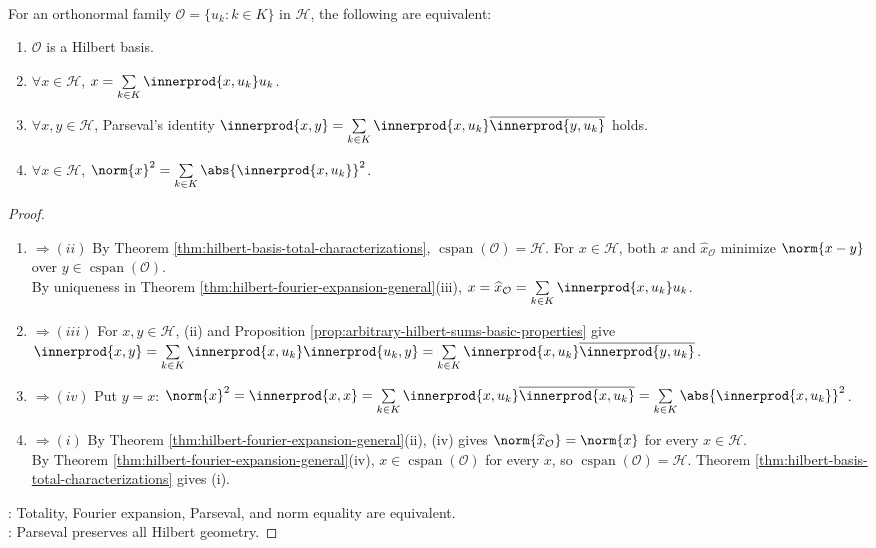 \begin{corollary} \label{cor:parseval-hilbert-basis-characterization} \\
For an orthonormal family $\mathcal{O}=\{u_k:k\in K\}$ in $\mathcal{H}$, the following are equivalent:
\begin{enumerate}[label=(\roman*)]
\setlength{\itemsep}{0pt}
\item $\mathcal{O}$ is a Hilbert basis.
\item $\forall x\in\mathcal{H}$, $x=\sum\limits_{k\in K}\innerprod{x,u_k}u_k$.
\item $\forall x,y\in\mathcal{H}$, Parseval's identity $\innerprod{x,y}=\sum\limits_{k\in K}\innerprod{x,u_k}\overline{\innerprod{y,u_k}}$ holds.
\item $\forall x\in\mathcal{H}$, $\norm{x}^2=\sum\limits_{k\in K}\abs{\innerprod{x,u_k}}^2$.
\end{enumerate}
\begin{proof}
\begin{enumerate}[label=(\roman*)]
\setlength{\itemsep}{0pt}
\item[$(i)$]$\Rightarrow (ii)$ By Theorem \ref{thm:hilbert-basis-total-characterizations}, $\operatorname{cspan}(\mathcal O)=\mathcal H$. For $x\in\mathcal H$, both $x$ and $\widehat{x}_{\mathcal O}$ minimize $\norm{x-y}$ over $y\in\operatorname{cspan}(\mathcal O)$.\\
By uniqueness in Theorem \ref{thm:hilbert-fourier-expansion-general}(iii), $x=\widehat{x}_{\mathcal O}=\sum\limits_{k\in K}\innerprod{x,u_k}u_k$.
\item[$(ii)$]$\Rightarrow (iii)$ For $x,y\in\mathcal H$, (ii) and Proposition \ref{prop:arbitrary-hilbert-sums-basic-properties} give $\innerprod{x,y}=\sum\limits_{k\in K}\innerprod{x,u_k}\innerprod{u_k,y}=\sum\limits_{k\in K}\innerprod{x,u_k}\overline{\innerprod{y,u_k}}$.
\item[$(iii)$]$\Rightarrow (iv)$ Put $y=x$: $\norm{x}^2=\innerprod{x,x}=\sum\limits_{k\in K}\innerprod{x,u_k}\overline{\innerprod{x,u_k}}=\sum\limits_{k\in K}\abs{\innerprod{x,u_k}}^2$.
\item[$(iv)$]$\Rightarrow (i)$ By Theorem \ref{thm:hilbert-fourier-expansion-general}(ii), (iv) gives $\norm{\widehat{x}_{\mathcal O}}=\norm{x}$ for every $x\in\mathcal H$.\\
By Theorem \ref{thm:hilbert-fourier-expansion-general}(iv), $x\in\operatorname{cspan}(\mathcal O)$ for every $x$, so $\operatorname{cspan}(\mathcal O)=\mathcal H$. Theorem \ref{thm:hilbert-basis-total-characterizations} gives (i).
\end{enumerate}
: Totality, Fourier expansion, Parseval, and norm equality are equivalent.\\
: Parseval preserves all Hilbert geometry.
\end{proof}
\end{corollary}

